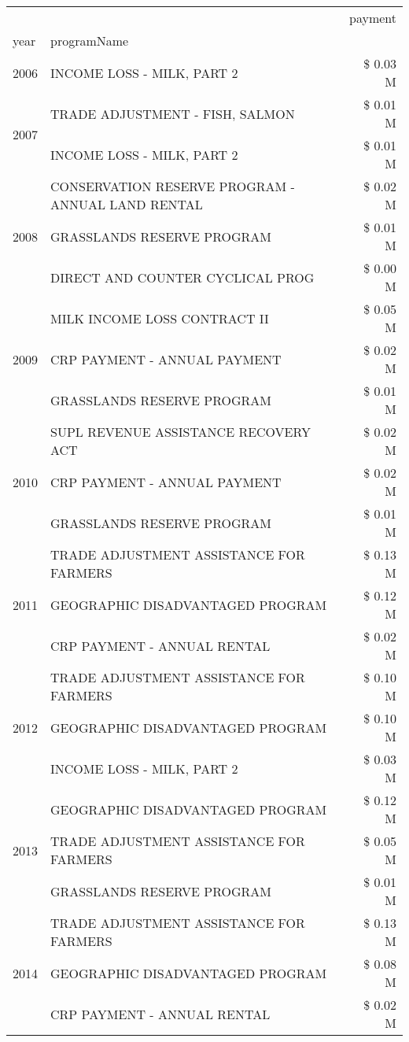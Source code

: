 \begin{tabular}{llr}
\toprule
 &  & payment \\
year & programName &  \\
\midrule
2006 & INCOME LOSS - MILK, PART 2 & \$ 0.03 M \\
\cline{1-3}
\multirow[t]{2}{*}{2007} & TRADE ADJUSTMENT - FISH, SALMON & \$ 0.01 M \\
 & INCOME LOSS - MILK, PART 2 & \$ 0.01 M \\
\cline{1-3}
\multirow[t]{3}{*}{2008} & CONSERVATION RESERVE PROGRAM - ANNUAL LAND RENTAL & \$ 0.02 M \\
 & GRASSLANDS RESERVE PROGRAM & \$ 0.01 M \\
 & DIRECT AND COUNTER CYCLICAL PROG & \$ 0.00 M \\
\cline{1-3}
\multirow[t]{3}{*}{2009} & MILK INCOME LOSS CONTRACT II & \$ 0.05 M \\
 & CRP PAYMENT - ANNUAL PAYMENT & \$ 0.02 M \\
 & GRASSLANDS RESERVE PROGRAM & \$ 0.01 M \\
\cline{1-3}
\multirow[t]{3}{*}{2010} & SUPL REVENUE ASSISTANCE RECOVERY ACT & \$ 0.02 M \\
 & CRP PAYMENT - ANNUAL PAYMENT & \$ 0.02 M \\
 & GRASSLANDS RESERVE PROGRAM & \$ 0.01 M \\
\cline{1-3}
\multirow[t]{3}{*}{2011} & TRADE ADJUSTMENT ASSISTANCE FOR FARMERS & \$ 0.13 M \\
 & GEOGRAPHIC DISADVANTAGED PROGRAM & \$ 0.12 M \\
 & CRP PAYMENT - ANNUAL RENTAL & \$ 0.02 M \\
\cline{1-3}
\multirow[t]{3}{*}{2012} & TRADE ADJUSTMENT ASSISTANCE FOR FARMERS & \$ 0.10 M \\
 & GEOGRAPHIC DISADVANTAGED PROGRAM & \$ 0.10 M \\
 & INCOME LOSS - MILK, PART 2 & \$ 0.03 M \\
\cline{1-3}
\multirow[t]{3}{*}{2013} & GEOGRAPHIC DISADVANTAGED PROGRAM & \$ 0.12 M \\
 & TRADE ADJUSTMENT ASSISTANCE FOR FARMERS & \$ 0.05 M \\
 & GRASSLANDS RESERVE PROGRAM & \$ 0.01 M \\
\cline{1-3}
\multirow[t]{3}{*}{2014} & TRADE ADJUSTMENT ASSISTANCE FOR FARMERS & \$ 0.13 M \\
 & GEOGRAPHIC DISADVANTAGED PROGRAM & \$ 0.08 M \\
 & CRP PAYMENT - ANNUAL RENTAL & \$ 0.02 M \\

\end{tabular}
